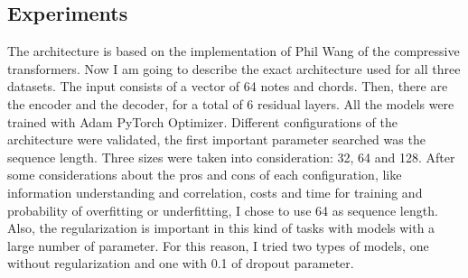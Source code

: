 \subsection{Experiments}
The architecture is based on the implementation of Phil Wang \cite{compressive_library} of the compressive transformers. Now I am going to describe the exact architecture used for all three datasets. The input consists of a vector of 64 notes and chords. Then, there are the encoder and the decoder, for a total of 6 residual layers. All the models were trained with Adam PyTorch Optimizer. Different configurations of the architecture were validated, the first important parameter searched was the sequence length. Three sizes were taken into consideration: 32, 64 and 128. After some considerations about the pros and cons of each configuration, like information understanding and correlation, costs and time for training and probability of overfitting or underfitting, I chose to use 64 as sequence length. Also, the regularization is important in this kind of tasks with models with a large number of parameter. For this reason, I tried two types of models, one without regularization and one with 0.1 of dropout parameter. 


